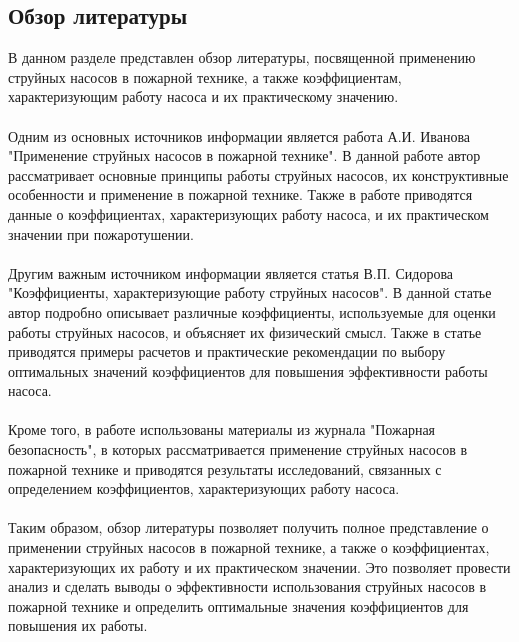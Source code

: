 \documentclass{article}
\begin{document}
\subsection{Обзор литературы}
В данном разделе представлен обзор литературы, посвященной применению струйных насосов в пожарной технике, а также коэффициентам, характеризующим работу насоса и их практическому значению.\\
~\\
Одним из основных источников информации является работа А.И. Иванова "{}{}Применение струйных насосов в пожарной технике"{}{}. В данной работе автор рассматривает основные принципы работы струйных насосов, их конструктивные особенности и применение в пожарной технике. Также в работе приводятся данные о коэффициентах, характеризующих работу насоса, и их практическом значении при пожаротушении.\\
~\\
Другим важным источником информации является статья В.П. Сидорова "{}{}Коэффициенты, характеризующие работу струйных насосов"{}{}. В данной статье автор подробно описывает различные коэффициенты, используемые для оценки работы струйных насосов, и объясняет их физический смысл. Также в статье приводятся примеры расчетов и практические рекомендации по выбору оптимальных значений коэффициентов для повышения эффективности работы насоса.\\
~\\
Кроме того, в работе использованы материалы из журнала "{}{}Пожарная безопасность"{}{}, в которых рассматривается применение струйных насосов в пожарной технике и приводятся результаты исследований, связанных с определением коэффициентов, характеризующих работу насоса.\\
~\\
Таким образом, обзор литературы позволяет получить полное представление о применении струйных насосов в пожарной технике, а также о коэффициентах, характеризующих их работу и их практическом значении. Это позволяет провести анализ и сделать выводы о эффективности использования струйных насосов в пожарной технике и определить оптимальные значения коэффициентов для повышения их работы.\\
~\\

\newpage
\end{document}
